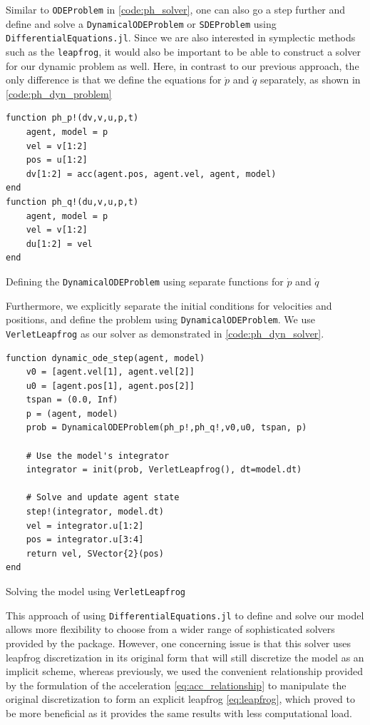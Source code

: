 Similar to \texttt{ODEProblem} in \autoref{code:ph_solver}, one can also go a step further and define and solve a \texttt{DynamicalODEProblem} or \texttt{SDEProblem} using \texttt{DifferentialEquations.jl}. Since we are also interested in symplectic methods such as the \texttt{leapfrog}, it would also be important to be able to construct a solver for our dynamic problem as well. Here, in contrast to our previous approach, the only difference is that we define the equations for $\dot p$ and $\dot q$ separately, as shown in \autoref{code:ph_dyn_problem}
\begin{listing}[H]
\begin{verbatim}    
function ph_p!(dv,v,u,p,t)
    agent, model = p
    vel = v[1:2]
    pos = u[1:2]
    dv[1:2] = acc(agent.pos, agent.vel, agent, model)
end
function ph_q!(du,v,u,p,t)
    agent, model = p
    vel = v[1:2]
    du[1:2] = vel
end
\end{verbatim}
\caption{Defining the \texttt{DynamicalODEProblem} using separate functions for $\dot p$ and $\dot q$}
\label{code:ph_dyn_problem}
\end{listing}
Furthermore, we explicitly separate the initial conditions for velocities and positions, and define the problem using \texttt{DynamicalODEProblem}. We use \texttt{VerletLeapfrog} as our solver as demonstrated in \autoref{code:ph_dyn_solver}.
\begin{listing}[H]
\begin{verbatim}        
function dynamic_ode_step(agent, model)
    v0 = [agent.vel[1], agent.vel[2]]
    u0 = [agent.pos[1], agent.pos[2]]
    tspan = (0.0, Inf)
    p = (agent, model)
    prob = DynamicalODEProblem(ph_p!,ph_q!,v0,u0, tspan, p)
    
    # Use the model's integrator
    integrator = init(prob, VerletLeapfrog(), dt=model.dt)
    
    # Solve and update agent state
    step!(integrator, model.dt)
    vel = integrator.u[1:2]
    pos = integrator.u[3:4]
    return vel, SVector{2}(pos)
end
\end{verbatim}
\caption{Solving the model using \texttt{VerletLeapfrog}}
\label{code:ph_dyn_solver}
\end{listing}

This approach of using \texttt{DifferentialEquations.jl} to define and solve our model allows more flexibility to choose from a wider range of sophisticated solvers provided by the package. However, one concerning issue is that this solver uses leapfrog discretization in its original form that will still discretize the model as an implicit scheme, whereas previously, we used the convenient relationship provided by the formulation of the acceleration \autoref{eq:acc_relationship} to manipulate the original discretization to form an explicit leapfrog \autoref{eq:leapfrog}, which proved to be more beneficial as it provides the same results with less computational load.

